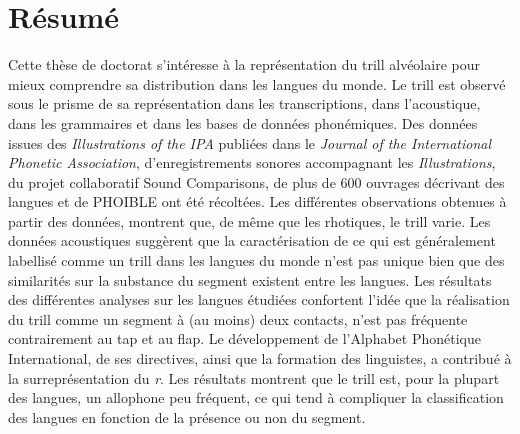 \chapter*{Résumé}

Cette thèse de doctorat s'intéresse à la représentation du trill alvéolaire pour mieux comprendre sa distribution dans les langues du monde. Le trill est observé sous le prisme de sa représentation dans les transcriptions, dans l'acoustique, dans les grammaires et dans les bases de données phonémiques. Des données issues des \textit{Illustrations of the IPA} publiées dans le \textit{Journal of the International Phonetic Association}, d'enregistrements sonores accompagnant les \textit{Illustrations}, du projet collaboratif Sound Comparisons, de plus de 600 ouvrages décrivant des langues et de PHOIBLE ont été récoltées. Les différentes observations obtenues à partir des données, montrent que, de même que les rhotiques, le trill varie. Les données acoustiques suggèrent que la caractérisation de ce qui est généralement labellisé comme un trill dans les langues du monde n'est pas unique bien que des similarités sur la substance du segment existent entre les langues. Les résultats des différentes analyses sur les langues étudiées confortent l'idée que la réalisation du trill comme un segment à (au moins) deux contacts, n'est pas fréquente contrairement au tap et au flap. Le développement de l'Alphabet Phonétique International, de ses directives, ainsi que la formation des linguistes, a contribué à la surreprésentation du \textit{r}. Les résultats montrent que le trill est, pour la plupart des langues, un allophone peu fréquent, ce qui tend à compliquer la classification des langues en fonction de la présence ou non du segment.